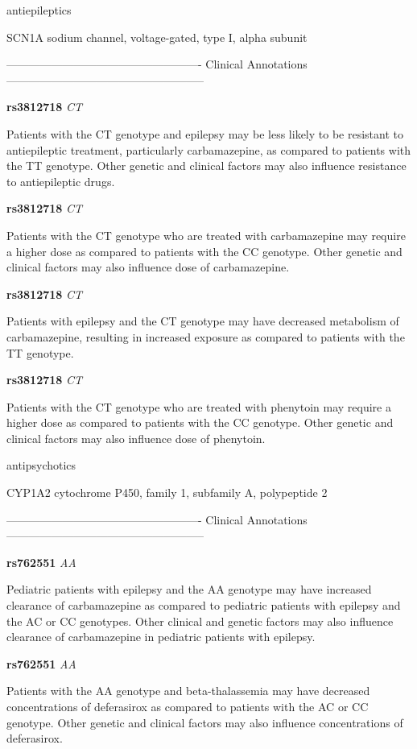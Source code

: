 \documentclass{resume} %
\begin{document}
\begin{rSection}{ antiepileptics }
\begin{rSubsection}{ SCN1A }{ sodium channel, voltage-gated, type I, alpha subunit }{}{}
\item[] ---------------------------------------------------- Clinical Annotations -----------------------------------------------------\newline
\item \textbf{ rs3812718 } \textit{ CT }
\item[] Patients with the CT genotype and epilepsy may be less likely to be resistant to antiepileptic treatment, particularly carbamazepine, as compared to patients with the TT genotype. Other genetic and clinical factors may also influence resistance to antiepileptic drugs.\item \textbf{ rs3812718 } \textit{ CT }
\item[] Patients with the CT genotype who are treated with carbamazepine may require a higher dose as compared to patients with the CC genotype. Other genetic and clinical factors may also influence dose of carbamazepine.\item \textbf{ rs3812718 } \textit{ CT }
\item[] Patients with epilepsy and the CT genotype may have decreased metabolism of carbamazepine, resulting in increased exposure as compared to patients with the TT genotype. \item \textbf{ rs3812718 } \textit{ CT }
\item[] Patients with the CT genotype who are treated with phenytoin may require a higher dose as compared to patients with the CC genotype. Other genetic and clinical factors may also influence dose of phenytoin.
\end{rSubsection}

\end{rSection}\begin{rSection}{ antipsychotics }
\item[]

\begin{rSubsection}{ CYP1A2 }{ cytochrome P450, family 1, subfamily A, polypeptide 2 }{}{}
\item[]

\item[] ---------------------------------------------------- Clinical Annotations -----------------------------------------------------\newline
\item \textbf{ rs762551 } \textit{ AA }
\item[] Pediatric patients with epilepsy and the AA genotype may have increased clearance of carbamazepine as compared to pediatric patients with epilepsy and the AC or CC genotypes. Other clinical and genetic factors may also influence clearance of carbamazepine in pediatric patients with epilepsy.\item \textbf{ rs762551 } \textit{ AA }
\item[] Patients with the AA genotype and beta-thalassemia may have decreased concentrations of deferasirox as compared to patients with the AC or CC genotype. Other genetic and clinical factors may also influence concentrations of deferasirox.
\end{rSubsection}


\end{rSection}
\end{document}
